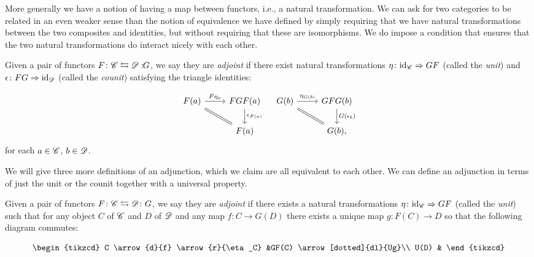 \documentclass{article}[11pt]
\begin{document}
More generally we have a notion of having a map between functors, i.e., a natural transformation. We can ask for two categories to be related in an even weaker sense than the notion of equivalence we have defined by simply requiring that we have natural transformations between the two composites and identities, but without requiring that these are isomorphisms. We do impose a condition that ensures that the two natural transformations do interact nicely with each other.

\begin{definition}\label{def1} Given a pair of functors $F\colon \mathscr{C} \leftrightarrows \mathscr{D}:\!\! G$, we say they are \textit{adjoint} if there exist natural transformations $\eta \colon \text{id}_{\mathscr{C}} \Rightarrow GF$ (called the \textit{unit}) and $\epsilon \colon FG \Rightarrow \text{id}_{\mathscr{D}}$ (called the \textit{counit}) satisfying the triangle identities:

\[
	\begin{tikzcd}
	F(a)\rar["F\eta_a" above]\ar[equal, dr] & FGF(a)\dar["\epsilon_{F(a)}" right] \\
	 & F(a)
	\end{tikzcd}\quad
	\begin{tikzcd}
	G(b)\rar["\eta_{G(b)}" above]\ar[equal, dr] & GFG(b)\dar["G(\epsilon_b)" right]\\
	& G(b),
	\end{tikzcd}
\]
for each $a\in \mathscr{C}$, $b\in \mathscr{D}$.

\end{definition}

We will give three more definitions of an adjunction, which we claim are all equivalent to each other. We can define an adjunction in terms of just the unit or the counit together with a universal property.

\begin{definition}\label{def2}
Given a pair of functors $F\colon \mathscr{C} \leftrightarrows \mathscr{D}\colon G$, we say they are \textit{adjoint} if there exists a natural transformations $\eta \colon \text{id}_{\mathscr{C}} \Rightarrow GF$ (called the \textit{unit}) such that for any object $C$ of $\mathscr{C}$ and $D$ of $\mathscr{D}$ and any map $f\colon C\to G(D)$ there exists a unique map $g \colon F(C) \to D$ so that the following diagram commutes:

\[\begin{tikzcd}
C \arrow{d}{f} \arrow{r}{\eta_C} &GF(C) \arrow[dotted]{dl}{Ug}\\
U(D)  & 
\end{tikzcd}\]
\end{definition} 
\end{document}
